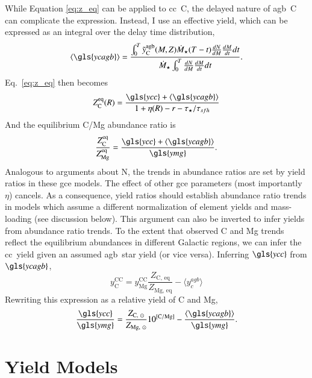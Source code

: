 \documentclass[12pt,oneside,letterpaper]{report}
\newcommand{\cc}{\gls{cc}}
\newcommand{\agb}{\gls{agb}}
\newcommand{\gce}{\gls{gce}}
\newcommand{\Ycc}{\gls{ycc}}
\newcommand{\Yoc}{\gls{ymg}}
\newcommand{\Ycagb}{\gls{ycagb}}
\begin{document}
While Equation \ref{eq:z_eq} can be applied to \cc\ C, the delayed nature of \agb\ C can complicate the expression. Instead, I use an effective yield, which can be expressed as an integral over the delay time distribution,
\begin{equation}
    \langle \Ycagb\rangle = \frac{\int_0^T \tilde{y}_{\rm C}^{\rm agb}(M, Z) \dot{M}_\star(T - t) \frac{dN}{dM} \frac{dM}{dt} dt  }{ \dot{M}_\star \int_0^T \frac{dN}{dM} \frac{dM}{dt} dt}.
\end{equation}
Eq.~\ref{eq:z_eq} then becomes
\begin{equation}
    Z_{\rm C}^{\rm eq}(R) = \frac{\Ycc + \langle\Ycagb\rangle}{1 + \eta(R) - r - \tau_\star / \tau_{sfh}}
\end{equation}
And the equilibrium C/Mg abundance ratio is
\begin{equation}\label{eq:z_co}
    \frac{Z_{\rm C}^{\rm eq}}{Z_{\rm Mg}^{\rm eq}} = \frac{\Ycc + \langle \Ycagb \rangle }{\Yoc}.
\end{equation}
Analogous to \cite{james+23} arguments about N, the trends in abundance ratios are set by yield ratios in these \gce{} models. The effect of other \gce{} parameters (most importantly $\eta$) cancels. As a consequence, yield ratios should establish abundance ratio trends in models which assume a different normalization of element yields and mass-loading (see discussion below).
This argument can also be inverted to infer  yields from abundance ratio trends. To the extent that observed C and Mg trends reflect the equilibrium abundances in different Galactic regions, we can infer the \cc\ yield given an assumed \agb\ star yield (or vice versa). Inferring $\Ycc$ from $\Ycagb$, 
\begin{equation}
    y_\text{C}^\text{CC} =  y_\text{Mg}^\text{CC} \frac{Z_\text{C,~eq}}{Z_\text{Mg,~eq}} - \langle y_c^{agb} \rangle
\end{equation}
Rewriting this expression as a relative yield of C and Mg,
\begin{equation}\label{eq:y_c_eq}
    \frac{\Ycc}{\Yoc} = \frac{Z_{\text{C},~\odot}}{Z_{\text{Mg},~\odot}} 10^{\rm [C/Mg]} - \frac{\langle \Ycagb \rangle}{\Yoc}.
\end{equation}

\section{Yield Models}
\end{document}
